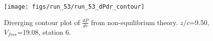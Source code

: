 \begin{figure}[H]
\centering
\texttt{[image: figs/run\_53/run\_53\_dPdr\_contour]}
\caption{Diverging contour plot of $\frac{d\bar{P}}{dr}$ from non-equilibrium theory. $z/c$=9.50, $V_{free}$=19.08, station 6.}
\label{fig:run_53_dPdr_contour}
\end{figure}



